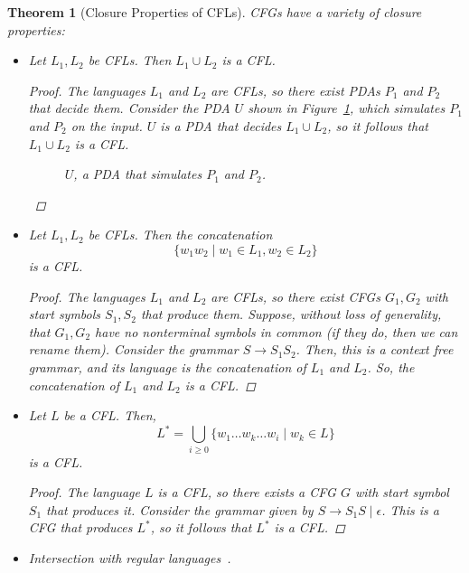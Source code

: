 \documentclass[psamsfonts]{amsart}
\newtheorem{thm}{Theorem}[section]
\theoremstyle{definition}
\theoremstyle{remark}
\numberwithin{equation}{section}
\begin{document}
\begin{thm}[Closure Properties of \acp{CFL}]
  \aclp{CFG} have a variety of closure properties:
  \begin{itemize}
  \item Let $L_1,L_2$ be \acp{CFL}. Then $L_1\cup L_2$ is a \ac{CFL}.
    \begin{proof}
      The languages $L_1$ and $L_2$ are \aclp{CFL}, so there exist \aclp{PDA} $P_1$ and $P_2$
      that decide them. Consider the \ac{PDA} $U$ shown in
      Figure~\ref{pda:union}, which simulates $P_1$ and $P_2$ on the input. $U$
      is a \ac{PDA} that decides $L_1\cup L_2$, so it follows that
      $L_1\cup L_2$ is a \ac{CFL}.
      \begin{figure}[h]
        \caption{$U$, a \ac{PDA} that simulates $P_1$ and $P_2$.}
        \label{pda:union}
      \end{figure}
    \end{proof}
  \item Let $L_1,L_2$ be \acp{CFL}. Then the concatenation \[
      \{w_1w_2 \mid w_1\in L_1, w_2 \in L_2\}
    \]
    is a \ac{CFL}.
    \begin{proof}
      The languages $L_1$ and $L_2$ are \aclp{CFL}, so there exist \acp{CFG}
      $G_1,G_2$ with start symbols $S_1,S_2$ that produce them. Suppose, without loss of generality, that
      $G_1,G_2$ have no nonterminal symbols in common (if they do, then we can rename
      them). Consider the grammar $S \rightarrow S_1S_2$. Then, this is a
      context free grammar, and its language is the concatenation of $L_1$ and
      $L_2$. So, the concatenation of $L_1$ and $L_2$ is a \ac{CFL}.
    \end{proof}
  \item Let $L$ be a \ac{CFL}. Then,
    \[
      L^* = \bigcup_{i \geq 0}\{w_1 \dots w_k\dots w_i \mid w_k\in L\}
    \]
    is a \ac{CFL}.
    \begin{proof}
      The language $L$ is a \ac{CFL}, so there exists a \ac{CFG} $G$ with start
      symbol $S_1$ that produces it. Consider the grammar given by $S\rightarrow
      S_1S\mid\epsilon$. This is a \ac{CFG} that produces $L^*$, so it follows
      that $L^*$ is a \ac{CFL}.
    \end{proof}
    \item Intersection with regular languages~\cite{hopcroft07:_introd_autom_theor_languag_comput}.\todo{}
  \end{itemize}
\end{thm}
\end{document}
